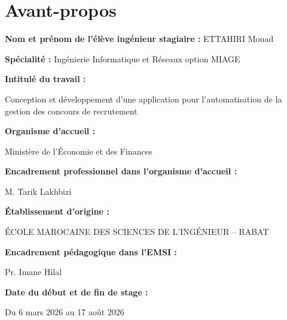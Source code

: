 \chapter*{Avant-propos}
\adjustmtc
\thispagestyle{MyStyle}

\textbf{Nom et prénom de l'élève ingénieur stagiaire :} ETTAHIRI Mouad

\textbf{Spécialité :} Ingénierie Informatique et Réseaux option MIAGE

\textbf{Intitulé du travail :}

{\centering
Conception et développement d'une application pour l'automatisation de la gestion des concours de recrutement\par}

\textbf{Organisme d'accueil :}
{\centering
Ministère de l'Économie et des Finances\par}

\textbf{Encadrement professionnel dans l'organisme d'accueil :}
{\centering
M. Tarik Lakhbizi\par}

\textbf{Établissement d'origine :}
{\centering
ÉCOLE MAROCAINE DES SCIENCES DE L'INGÉNIEUR -- RABAT\par}

\textbf{Encadrement pédagogique dans l'EMSI :}
{\centering
Pr. Imane Hilal\par}

\textbf{Date du début et de fin de stage :}
{\centering
Du 6 mars 2026 au 17 août 2026\par}
